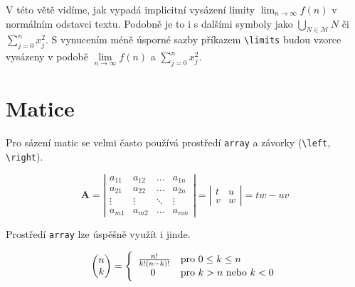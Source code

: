 \documentclass[11pt,a4paper,twocolumn]{article}
\begin{document}
    V této větě vidíme, jak vypadá implicitní vysázení limity $\lim_{n\to\infty} f(n)$ v normálním odstavci textu. Podobně je to i s dalšími symboly jako $\bigcup_{N\in \mathcal{M}} N$ či $\sum^{n}_{j=0}x^{2}_{j}$.
    S vynucením méně úsporné sazby příkazem \verb|\limits| budou vzorce vysázeny v podobě $\lim\limits _{n \to \infty} f(n)$ a $\sum\limits _{j=0}^n x^{2}_{j}.$ 
    
    \section{Matice} \label{MaticeSection}
    Pro sázení matic se velmi často používá prostředí \verb|array| a závorky (\verb|\left|, \verb|\right|). 
    
    \[ \textbf{A} = \left| \begin{array}{cccc}
    a_{11} & a_{12} & \dots & a_{1n} \\
    a_{21} & a_{22} & \dots & a_{2n} \\
    \vdots & \vdots & \ddots& \vdots \\
    a_{m1} & a_{m2} & \dots & a_{mn} 
    \end{array} \right| 
    =
    \left| \begin{array}{cc}
        t & u \\
        v & w
    \end{array} \right|
    = tw - uv
    \] 
    
    Prostředí \verb|array| lze úspěšně využít i jinde.
    
    \[ 
    \left(\!
        \begin{array}{{@{\,} c @{\!\,}}}
            n \\
            k
        \end{array}
    \right)
    = \Bigg\{ \begin{array}{ll}
         \frac{n!}{k!(n-k)!} & \text{pro $0 \leq k \leq n $} \\
         \quad\;0            & \text{pro $ k > n $ nebo $ k < 0 $}
    \end{array} 
    \]
    
\end{document}
